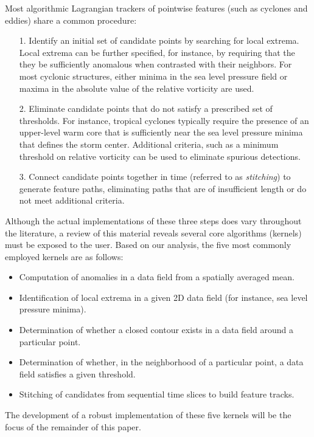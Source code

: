 \documentclass[gmdd, hvmath, online]{copernicus_discussions}
\begin{document}
Most algorithmic Lagrangian trackers of pointwise features (such as cyclones and eddies) share a common procedure:
\begin{itemize}
\item[1.] Identify an initial set of candidate points by searching for local extrema.  Local extrema can be further specified, for instance, by requiring that the they be sufficiently anomalous when contrasted with their neighbors.  For most cyclonic structures, either minima in the sea level pressure field or maxima in the absolute value of the relative vorticity are used.
\item[2.] Eliminate candidate points that do not satisfy a prescribed set of thresholds.  For instance, tropical cyclones typically require the presence of an upper-level warm core that is sufficiently near the sea level pressure minima that defines the storm center.  Additional criteria, such as a minimum threshold on relative vorticity can be used to eliminate spurious detections.  
\item[3.] Connect candidate points together in time (referred to as \textit{stitching}) to generate feature paths, eliminating paths that are of insufficient length or do not meet additional criteria.
\end{itemize}  Although the actual implementations of these three steps does vary throughout the literature, a review of this material reveals several core algorithms (kernels) must be exposed to the user.  Based on our analysis, the five most commonly employed kernels are as follows:
\begin{itemize}
\item Computation of anomalies in a data field from a spatially averaged mean.
\item Identification of local extrema in a given 2D data field (for instance, sea level pressure minima).
\item Determination of whether a closed contour exists in a data field around a particular point.
\item Determination of whether, in the neighborhood of a particular point, a data field satisfies a given threshold.
\item Stitching of candidates from sequential time slices to build feature tracks.
\end{itemize}  The development of a robust implementation of these five kernels will be the focus of the remainder of this paper.
\end{document}
